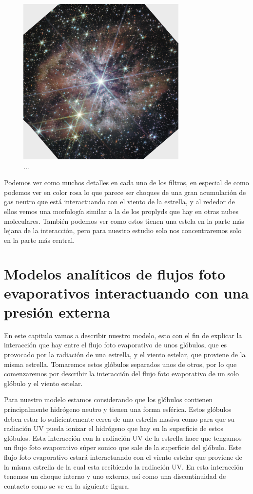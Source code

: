 \documentclass{book}
\begin{document}
\begin{figure}[h]
    \centering
    \includegraphics[width=0.75\textwidth]{Chp1_m1-67-JWST.jpg}
    \caption{...}
    \label{fig:zones}
\end{figure}

Podemos ver como muchos detalles en cada uno de los filtros, en especial de como podemos ver en color rosa lo que parece ser choques de una gran acumulación de gas neutro que está interactuando con el viento de la estrella, y al rededor de ellos vemos una morfología similar a la de los proplyds que hay en otras nubes moleculares. También podemos ver como estos tienen una estela en la parte más lejana de la interacción, pero para nuestro estudio solo nos concentraremos solo en la parte más central.

\chapter{Modelos analíticos de flujos foto evaporativos interactuando con una presión externa}

En este capitulo vamos  a describir nuestro modelo, esto con el fin de explicar la interacción que hay entre el flujo foto evaporativo de unos glóbulos, que es provocado por la radiación de una estrella, y el viento estelar, que proviene de la misma estrella. Tomaremos estos glóbulos separados unos de otros, por lo que comenzaremos por describir la interacción del flujo foto evaporativo de un solo glóbulo y el viento estelar.

Para nuestro modelo estamos considerando que los glóbulos contienen principalmente hidrógeno neutro y tienen una forma esférica. Estos glóbulos deben estar lo suficientemente cerca de una estrella masiva como para que su radiación UV pueda ionizar el hidrógeno que hay en la superficie de estos glóbulos. Esta interacción con la radiación UV de la estrella hace que tengamos un flujo foto evaporativo súper sonico que sale de la superficie del glóbulo. Este flujo foto evaporativo estará interactuando con el viento estelar que proviene de la misma estrella de la cual esta recibiendo la radiación UV. En esta interacción tenemos un choque interno y uno externo, así como una discontinuidad de contacto como se ve en la siguiente figura.
\end{document}
